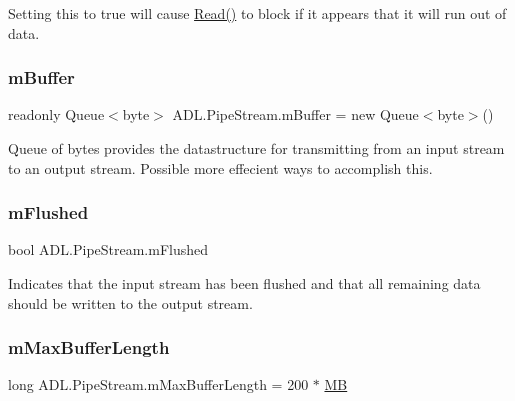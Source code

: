 Setting this to true will cause \mbox{\hyperlink{class_a_d_l_1_1_pipe_stream_ada829c0b71d6896e2bb3cd5d37ccba34}{Read()}} to block if it appears that it will run out of data. 

\mbox{\label{class_a_d_l_1_1_pipe_stream_ac3ea3e53b1c4a1344a6a9618a67751df}} 
\subsubsection{\texorpdfstring{m\+Buffer}{mBuffer}}
{\footnotesize\ttfamily readonly Queue$<$byte$>$ A\+D\+L.\+Pipe\+Stream.\+m\+Buffer = new Queue$<$byte$>$()\hspace{0.3cm}{\ttfamily [private]}}



Queue of bytes provides the datastructure for transmitting from an input stream to an output stream. Possible more effecient ways to accomplish this. 

\mbox{\label{class_a_d_l_1_1_pipe_stream_a186ff66fbf297d1491d7ca528326c3da}} 
\subsubsection{\texorpdfstring{m\+Flushed}{mFlushed}}
{\footnotesize\ttfamily bool A\+D\+L.\+Pipe\+Stream.\+m\+Flushed\hspace{0.3cm}{\ttfamily [private]}}



Indicates that the input stream has been flushed and that all remaining data should be written to the output stream. 

\mbox{\label{class_a_d_l_1_1_pipe_stream_af8cc7772cf7ae02b1890ab8c58d0cbad}} 
\subsubsection{\texorpdfstring{m\+Max\+Buffer\+Length}{mMaxBufferLength}}
{\footnotesize\ttfamily long A\+D\+L.\+Pipe\+Stream.\+m\+Max\+Buffer\+Length = 200 $\ast$ \mbox{\hyperlink{class_a_d_l_1_1_pipe_stream_ad4a04360b3d017567a0fd48defd434d0}{MB}}\hspace{0.3cm}{\ttfamily [private]}}




